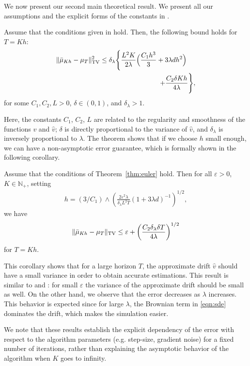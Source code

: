 We now present our second main theoretical result. We present all our assumptions and the explicit forms of the constants in \supp. 
\begin{thm}
\label{thm:euler}
Assume that the conditions given in \supp{} hold. Then, the following bound holds for $T=Kh$:
\begin{align}
\nonumber \| \bar{\mu}_{Kh} - \mu_T \|_{\textnormal{TV}}^2 \leq \delta_\lambda \Biggl\{  \frac{L^2 K}{2\lambda} \Bigl( \frac{C_1 h^3}{3} + 3 \lambda d h^2 \Bigr) \hspace{13pt} \\ + \frac{C_2  \delta K h}{4\lambda} \Biggr\}	,
\end{align} 
for some $C_1,C_2,L >0$, $\delta \in (0,1)$, and $\delta_\lambda >1$.  %
\end{thm}
Here, the constants $C_1$, $C_2$, $L$ are related to the regularity and smoothness of the functions $v$ and $\hat{v}$; $\delta$ is directly proportional to the variance of $\hat{v}$, and $\delta_\lambda$ is inversely proportional to $\lambda$. The theorem shows that 
if we choose $h$ small enough, we can have a non-asymptotic error guarantee, which is formally shown in the following corollary. 
\begin{cor}
  \label{coro:precision}
  Assume that the conditions of Theorem~\ref{thm:euler} hold. Then for all $\varepsilon >0$, $K \in \mathbb{N}_+$, setting
  \begin{align}
h = (3/C_1)\wedge\left(\frac{2 \varepsilon^2 \lambda}{\delta_\lambda L^2 T}(1+3\lambda d)^{-1}\right)^{1/2}, %
  \end{align}
  we have
  \begin{align}
    \| \bar{\mu}_{Kh} - \mu_T \|_{\textnormal{TV}} \leq \varepsilon + \left(\frac{C_2 \delta_\lambda \delta T}{4\lambda}\right)^{1/2} 
  \end{align}
  for $T=Kh$.
\end{cor}
This corollary shows that for a large horizon $T$, the approximate drift $\hat{v}$ should have a small variance in order to obtain accurate estimations. This result is similar to \cite{raginsky17a} and \cite{nguyen2019non}: for small $\varepsilon$ the variance of the approximate drift should be small as well. On the other hand, we observe that the error decreases as $\lambda$ increases. This behavior is expected since for large $\lambda$, the Brownian term in \eqref{eqn:sde} dominates the drift, which makes the simulation easier.

We note that these results establish the explicit dependency of the error with respect to the algorithm parameters (e.g. step-size, gradient noise) for a fixed number of iterations, rather than explaining the asymptotic behavior of the algorithm when $K$ goes to infinity.

